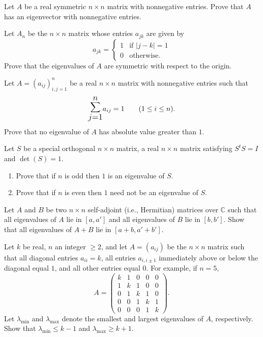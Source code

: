 \documentclass[12pt]{article}
\let\oldsum\sum
\renewcommand{\sum}{\mathlarger{\mathlarger{\oldsum}}}
\begin{document}
\begin{problem}
Let $A$ be a real symmetric $n \times n$ matrix with nonnegative entries. Prove that $A$ has an eigenvector with nonnegative entries.
\end{problem}

\begin{problem}
Let $A_n$ be the $n \times n$ matrix whose entries $a_{jk}$ are given by
\[
a_{jk} = \begin{cases} 1 & \text{if } |j-k| = 1 \\ 0 & \text{otherwise.} \end{cases}
\]
Prove that the eigenvalues of $A$ are symmetric with respect to the origin.
\end{problem}

\begin{problem}
Let $A = (a_{ij})_{i,j=1}^n$ be a real $n \times n$ matrix with nonnegative entries such that
\[
\sum_{j=1}^{n} a_{ij} = 1 \qquad (1 \leq i \leq n).
\]
Prove that no eigenvalue of $A$ has absolute value greater than $1$.
\end{problem}

\begin{problem}
Let $S$ be a special orthogonal $n \times n$ matrix, a real $n \times n$ matrix satisfying $S^t S = I$ and $\det(S) = 1$.
\begin{enumerate}[label=\arabic*.]
\item Prove that if $n$ is odd then $1$ is an eigenvalue of $S$.
\item Prove that if $n$ is even then $1$ need not be an eigenvalue of $S$.
\end{enumerate}
\end{problem}

\begin{problem}
Let $A$ and $B$ be two $n \times n$ self-adjoint (i.e., Hermitian) matrices over $\mathbb{C}$ such that all eigenvalues of $A$ lie in $[a,a']$ and all eigenvalues of $B$ lie in $[b,b']$. Show that all eigenvalues of $A+B$ lie in $[a+b, a'+b']$.
\end{problem}

\begin{problem}
Let $k$ be real, $n$ an integer $\geq 2$, and let $A = (a_{ij})$ be the $n \times n$ matrix such that all diagonal entries $a_{ii} = k$, all entries $a_{i,i\pm 1}$ immediately above or below the diagonal equal $1$, and all other entries equal $0$. For example, if $n=5$,
\[
A = \begin{pmatrix}
k & 1 & 0 & 0 & 0 \\
1 & k & 1 & 0 & 0 \\
0 & 1 & k & 1 & 0 \\
0 & 0 & 1 & k & 1 \\
0 & 0 & 0 & 1 & k
\end{pmatrix}.
\]
Let $\lambda_{\min}$ and $\lambda_{\max}$ denote the smallest and largest eigenvalues of $A$, respectively. Show that $\lambda_{\min} \leq k-1$ and $\lambda_{\max} \geq k+1$.
\end{problem}
\end{document}
